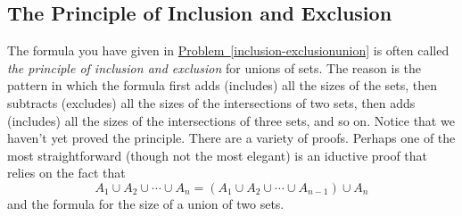 \documentclass[10pt,]{book}
\theoremstyle{plain}
\theoremstyle{definition}
\numberwithin{equation}{chapter}
\begin{document}
\subsection[{The Principle of Inclusion and Exclusion}]{The Principle of Inclusion and Exclusion}\label{subsection-53}
The formula you have given in \hyperref[inclusion-exclusionunion]{Problem~\ref{inclusion-exclusionunion}} is often called \emph{the principle of inclusion and exclusion} for unions of sets. The reason is the pattern in which the formula first adds (includes) all the sizes of the sets, then subtracts (excludes) all the sizes of the intersections of two sets, then adds (includes) all the sizes of the intersections of three sets, and so on.   Notice that we haven't yet proved the principle. There are a variety of proofs.  Perhaps one of the most straightforward (though not the most elegant) is an iductive proof that relies on the fact that%
\begin{equation*}
A_1 \cup A_2 \cup \cdots \cup A_n = \left(A_1 \cup A_2 \cup \cdots \cup A_{n-1}\right) \cup A_n
\end{equation*}
and the formula for the size of a union of two sets.%
\end{document}
